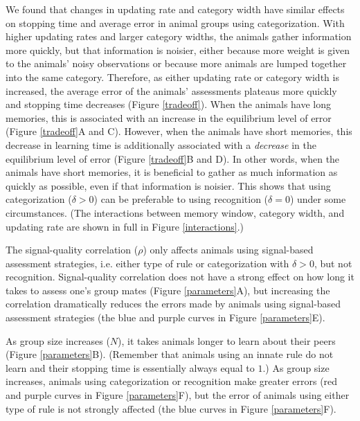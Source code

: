 We found that changes in updating rate and category width have similar effects on stopping time and average error in animal groups using categorization. With higher updating rates and larger category widths, the animals gather information more quickly, but that information is noisier, either because more weight is given to the animals' noisy observations or because more animals are lumped together into the same category. Therefore, as either updating rate or category width is increased, the average error of the animals' assessments plateaus more quickly and stopping time decreases (Figure \ref{tradeoff}). When the animals have long memories, this is associated with an increase in the equilibrium level of error (Figure \ref{tradeoff}A and C). However, when the animals have short memories, this decrease in learning time is additionally associated with a \emph{decrease} in the equilibrium level of error (Figure \ref{tradeoff}B and D). In other words, when the animals have short memories, it is beneficial to gather as much information as quickly as possible, even if that information is noisier. This shows that using categorization ($\delta>0$) can be preferable to using recognition ($\delta=0$) under some circumstances. (The interactions between memory window, category width, and updating rate are shown in full in Figure \ref{interactions}.)

The signal-quality correlation ($\rho$) only affects animals using signal-based assessment strategies, i.e. either type of rule or categorization with $\delta>0$, but not recognition. Signal-quality correlation does not have a strong effect on how long it takes to assess one's group mates (Figure \ref{parameters}A), but increasing the correlation dramatically reduces the errors made by animals using signal-based assessment strategies (the blue and purple curves in Figure \ref{parameters}E).

As group size increases ($N$), it takes animals longer to learn about their peers (Figure \ref{parameters}B). (Remember that animals using an innate rule do not learn and their stopping time is essentially always equal to $1$.) As group size increases, animals using categorization or recognition make greater errors (red and purple curves in Figure \ref{parameters}F), but the error of animals using either type of rule is not strongly affected (the blue curves in Figure \ref{parameters}F).

